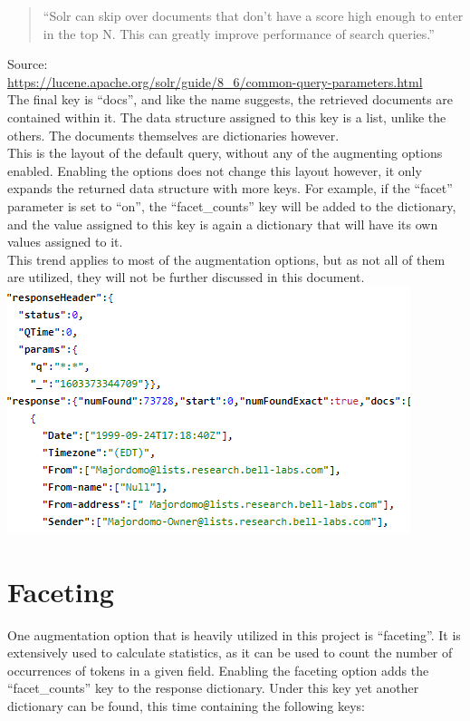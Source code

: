 \documentclass[a4paper,english]{report}
\begin{document}
 \begin{quotation}
	“Solr can skip over documents that don’t have a score high enough to enter in the top N. This can greatly improve performance of search queries.” 
 \end{quotation}
Source:\\ \url{https://lucene.apache.org/solr/guide/8_6/common-query-parameters.html}\\

The final key is “docs”, and like the name suggests, the retrieved documents are contained within it. The data structure assigned to this key is a list, unlike the others. The documents themselves are dictionaries however.\\

This is the layout of the default query, without any of the augmenting options enabled.
Enabling the options does not change this layout however, it only expands the returned data structure with more keys. For example, if the “facet” parameter is set to “on”, the “facet\_counts” key will be added to the dictionary, and the value assigned to this key is again a dictionary that will have its own values assigned to it.\\ 

This trend applies to most of the augmentation options, but as not all of them are utilized, they will not be further discussed in this document. \\


\includegraphics{gui3}

\section{Faceting}

One augmentation option that is heavily utilized in this project is “faceting”. It is extensively used to calculate statistics, as it can be used to count the number of occurrences of tokens in a given field.
Enabling the faceting option adds the “facet\_counts” key to the response dictionary.
Under this key yet another dictionary can be found, this time containing the following keys:
\end{document}

